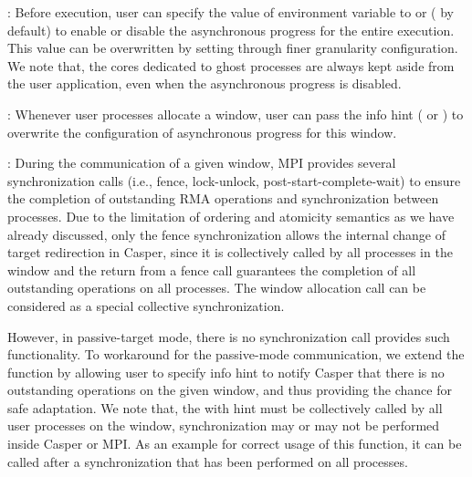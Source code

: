 :
Before execution, user can specify the value of environment variable
 to  or  ( by
default) to enable or disable the asynchronous progress for the entire
execution. This value can be overwritten by setting through finer
granularity configuration. We note that, the cores dedicated to ghost
processes are always kept aside from the user application, even when
the asynchronous progress is disabled.

:
Whenever user processes allocate a window, user can pass the info hint
 ( or ) to overwrite the
configuration of asynchronous progress for this window.

:
During the communication of a given window, MPI provides several
synchronization calls (i.e., fence, lock-unlock, post-start-complete-wait)
to ensure the completion of outstanding RMA operations and synchronization
between processes. Due to the limitation of ordering and atomicity
semantics as we have already discussed, only the fence synchronization
allows the internal change of target redirection in Casper, since it
is collectively called by all processes in the window and the return
from a fence call guarantees the completion of all outstanding operations
on all processes. The window allocation call can be considered as
a special collective synchronization.

However, in passive-target mode, there is no synchronization call provides
such functionality. To workaround for the passive-mode communication, we
extend the  function by allowing user to specify
info hint  to notify Casper that there is no outstanding
operations on the given window, and thus providing the chance for safe
adaptation. We note that, the  with 
hint must be collectively called by all user processes on the window,
synchronization may or may not be performed inside Casper or MPI. As an
example for correct usage of this function, it can be called after
a  synchronization that has been performed on all
processes.



